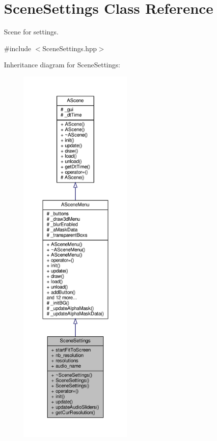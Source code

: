 \hypertarget{class_scene_settings}{}\section{Scene\+Settings Class Reference}
\label{class_scene_settings}


Scene for settings.  




{\ttfamily \#include $<$Scene\+Settings.\+hpp$>$}



Inheritance diagram for Scene\+Settings\+:
\nopagebreak
\begin{figure}[H]
\begin{center}
\leavevmode
\includegraphics[height=550pt]{class_scene_settings__inherit__graph}
\end{center}
\end{figure}


